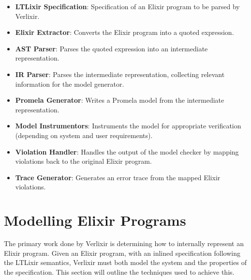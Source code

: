 \begin{itemize}
    \item \textbf{LTLixir Specification}: Specification of an Elixir program to be parsed by Verlixir.
    \item \textbf{Elixir Extractor}: Converts the Elixir program into a quoted expression.
    \item \textbf{AST Parser}: Parses the quoted expression into an intermediate representation.
    \item \textbf{IR Parser}: Parses the intermediate representation, collecting relevant information for the model generator.
    \item \textbf{Promela Generator}: Writes a Promela model from the intermediate representation.
    \item \textbf{Model Instrumentors}: Instruments the model for appropriate verification (depending on system and user requirements).
    \item \textbf{Violation Handler}: Handles the output of the model checker by mapping violations back to the original Elixir program.
    \item \textbf{Trace Generator}: Generates an error trace from the mapped Elixir violations.
\end{itemize}

\section{Modelling Elixir Programs} \label{sec:modelling_elixir_programs}
The primary work done by Verlixir is determining how to internally represent an Elixir program. Given an Elixir program, with an inlined specification following the LTLixir semantics, Verlixir must both model the system and the properties of the specification. This section will outline the techniques used to achieve this.
